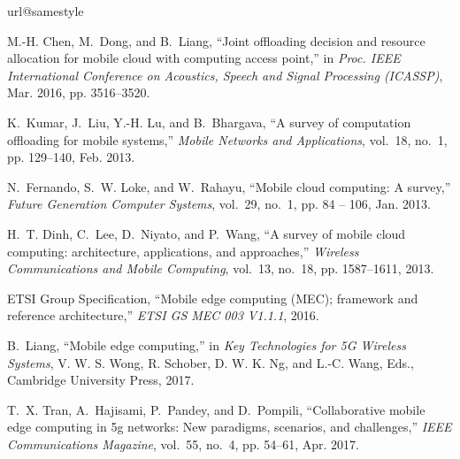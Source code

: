 \documentclass[10pt,journal,compsoc]{IEEEtran}
\begin{document}
{%
\begin{thebibliography}{10}
\providecommand{\url}[1]{#1}
\csname url@samestyle\endcsname
\providecommand{\newblock}{\relax}
\providecommand{\bibinfo}[2]{#2}
\providecommand{\BIBentrySTDinterwordspacing}{\spaceskip=0pt\relax}
\providecommand{\BIBentryALTinterwordstretchfactor}{4}
\providecommand{\BIBentryALTinterwordspacing}{\spaceskip=\fontdimen2\font plus
\BIBentryALTinterwordstretchfactor\fontdimen3\font minus
  \fontdimen4\font\relax}
\providecommand{\BIBforeignlanguage}[2]{{%
\expandafter\ifx\csname l@#1\endcsname\relax
\typeout{** WARNING: IEEEtran.bst: No hyphenation pattern has been}%
\typeout{** loaded for the language `#1'. Using the pattern for}%
\typeout{** the default language instead.}%
\else
\language=\csname l@#1\endcsname
\fi
#2}}
\providecommand{\BIBdecl}{\relax}
\BIBdecl

M.-H. Chen, M.~Dong, and B.~Liang, ``Joint offloading decision and resource
  allocation for mobile cloud with computing access point,'' in \emph{Proc.
  IEEE International Conference on Acoustics, Speech and Signal Processing
  (ICASSP)}, Mar. 2016, pp. 3516--3520.

K.~Kumar, J.~Liu, Y.-H. Lu, and B.~Bhargava, ``A survey of computation
  offloading for mobile systems,'' \emph{Mobile Networks and Applications},
  vol.~18, no.~1, pp. 129--140, Feb. 2013.

N.~Fernando, S.~W. Loke, and W.~Rahayu, ``Mobile cloud computing: A survey,''
  \emph{Future Generation Computer Systems}, vol.~29, no.~1, pp. 84 -- 106,
  Jan. 2013.

H.~T. Dinh, C.~Lee, D.~Niyato, and P.~Wang, ``A survey of mobile cloud
  computing: architecture, applications, and approaches,'' \emph{Wireless
  Communications and Mobile Computing}, vol.~13, no.~18, pp. 1587--1611, 2013.

{ETSI Group Specification}, ``Mobile edge computing ({MEC}); framework and
  reference architecture,'' \emph{ETSI GS MEC 003 V1.1.1}, 2016.

B.~Liang, ``Mobile edge computing,'' in \emph{Key Technologies for 5G Wireless
  Systems}, V. W. S. Wong, R. Schober, D. W. K. Ng, and L.-C. Wang, Eds.,
  Cambridge University Press, 2017.

T.~X. Tran, A.~Hajisami, P.~Pandey, and D.~Pompili, ``Collaborative mobile edge
  computing in 5g networks: New paradigms, scenarios, and challenges,''
  \emph{IEEE Communications Magazine}, vol.~55, no.~4, pp. 54--61, Apr. 2017.


\end{thebibliography}}
\end{document}
